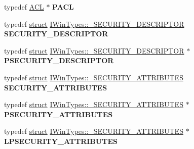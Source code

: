 \begin{DoxyCompactItemize}
typedef \hyperlink{struct_i_win_types_1_1___a_c_l}{A\+CL} $\ast$ {\bfseries P\+A\+CL}
\item 
\mbox{\label{interface_i_win_types_a86166b51ba7053467682d7064e5a95a2}} 
typedef \hyperlink{interfacestruct}{struct} \hyperlink{struct_i_win_types_1_1___s_e_c_u_r_i_t_y___d_e_s_c_r_i_p_t_o_r}{I\+Win\+Types\+::\+\_\+\+S\+E\+C\+U\+R\+I\+T\+Y\+\_\+\+D\+E\+S\+C\+R\+I\+P\+T\+OR} {\bfseries S\+E\+C\+U\+R\+I\+T\+Y\+\_\+\+D\+E\+S\+C\+R\+I\+P\+T\+OR}
\item 
\mbox{\label{interface_i_win_types_a2f22f278dc7f3922ea2a4ababcdb9243}} 
typedef \hyperlink{interfacestruct}{struct} \hyperlink{struct_i_win_types_1_1___s_e_c_u_r_i_t_y___d_e_s_c_r_i_p_t_o_r}{I\+Win\+Types\+::\+\_\+\+S\+E\+C\+U\+R\+I\+T\+Y\+\_\+\+D\+E\+S\+C\+R\+I\+P\+T\+OR} $\ast$ {\bfseries P\+S\+E\+C\+U\+R\+I\+T\+Y\+\_\+\+D\+E\+S\+C\+R\+I\+P\+T\+OR}
\item 
\mbox{\label{interface_i_win_types_a3136febf7d46c6e361a3a54b6a71bdf0}} 
typedef \hyperlink{interfacestruct}{struct} \hyperlink{struct_i_win_types_1_1___s_e_c_u_r_i_t_y___a_t_t_r_i_b_u_t_e_s}{I\+Win\+Types\+::\+\_\+\+S\+E\+C\+U\+R\+I\+T\+Y\+\_\+\+A\+T\+T\+R\+I\+B\+U\+T\+ES} {\bfseries S\+E\+C\+U\+R\+I\+T\+Y\+\_\+\+A\+T\+T\+R\+I\+B\+U\+T\+ES}
\item 
\mbox{\label{interface_i_win_types_a39e0e712b0318de72c9bd598b5b6b2bf}} 
typedef \hyperlink{interfacestruct}{struct} \hyperlink{struct_i_win_types_1_1___s_e_c_u_r_i_t_y___a_t_t_r_i_b_u_t_e_s}{I\+Win\+Types\+::\+\_\+\+S\+E\+C\+U\+R\+I\+T\+Y\+\_\+\+A\+T\+T\+R\+I\+B\+U\+T\+ES} $\ast$ {\bfseries P\+S\+E\+C\+U\+R\+I\+T\+Y\+\_\+\+A\+T\+T\+R\+I\+B\+U\+T\+ES}
\item 
\mbox{\label{interface_i_win_types_ac97349e8587246672f0d19e866949abe}} 
typedef \hyperlink{interfacestruct}{struct} \hyperlink{struct_i_win_types_1_1___s_e_c_u_r_i_t_y___a_t_t_r_i_b_u_t_e_s}{I\+Win\+Types\+::\+\_\+\+S\+E\+C\+U\+R\+I\+T\+Y\+\_\+\+A\+T\+T\+R\+I\+B\+U\+T\+ES} $\ast$ {\bfseries L\+P\+S\+E\+C\+U\+R\+I\+T\+Y\+\_\+\+A\+T\+T\+R\+I\+B\+U\+T\+ES}
\item 
\mbox{\label{interface_i_win_types_ac19cb42919cd52c52947950063b76bc3}} 

\end{DoxyCompactItemize}
